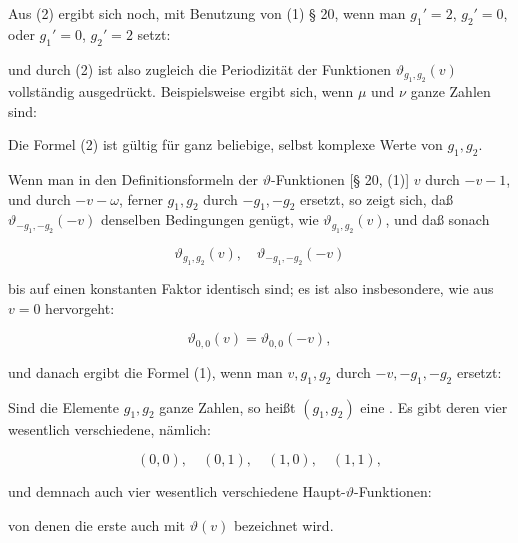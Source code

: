 
Aus (2) ergibt sich noch, mit Benutzung von (1) § 20, wenn
man $g_1' = 2$, $g_2' = 0$, oder $g_1' = 0$, $g_2' = 2$ setzt:


und durch (2) ist also zugleich die Periodizität der Funktionen
$\vartheta_{g_1,g_2}(v)$ vollständig ausgedrückt. Beispielsweise ergibt sich, wenn
$\mu$ und $\nu$ ganze Zahlen sind:



Die Formel (2) ist gültig für ganz beliebige, selbst komplexe
Werte von $g_1, g_2$.

Wenn man in den Definitionsformeln der $\vartheta$-Funktionen
[§ 20, (1)] $v$ durch $-v-1$, und durch $-v-\omega$, ferner $g_1, g_2$ durch
$-g_1, -g_2$ ersetzt, so zeigt sich, daß $\vartheta_{-g_1,-g_2}(-v)$ denselben Bedingungen
 genügt, wie $\vartheta_{g_1,g_2}(v)$, und daß sonach

\[
\vartheta_{g_1,g_2}(v),\quad \vartheta_{-g_1,-g_2}(-v)
\]

bis auf einen konstanten Faktor identisch sind; es ist also insbesondere, wie aus $v = 0$ hervorgeht:

\[
\vartheta_{0,0}(v) = \vartheta_{0,0}(-v),
\]

und danach ergibt die Formel (1), wenn man $v, g_1, g_2$ durch
$-v, -g_1, -g_2$ ersetzt:


Sind die Elemente $g_1, g_2$ ganze Zahlen, so heißt $(g_1, g_2)$
eine . Es gibt deren vier wesentlich
verschiedene, nämlich:

\[
(0,0),\quad (0,1),\quad (1,0),\quad (1,1),
\]

und demnach auch vier wesentlich verschiedene Haupt-$\vartheta$-Funktionen:


von denen die erste auch mit $\vartheta(v)$ bezeichnet wird.


